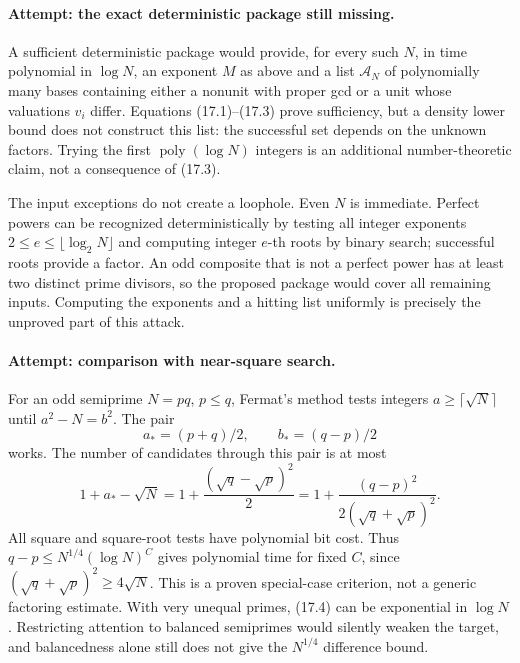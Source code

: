 \documentclass[11pt,a4paper]{article}
\begin{document}
\paragraph{Attempt: the exact deterministic package still missing.}
A sufficient deterministic package would provide, for every such $N$,
in time polynomial in $\log N$, an exponent $M$ as above and a list
$\mathcal A_N$ of polynomially many bases containing either a nonunit
with proper gcd or a unit whose valuations $v_i$ differ. Equations
(17.1)--(17.3) prove sufficiency, but a density lower bound does not
construct this list: the successful set depends on the unknown factors.
Trying the first $\operatorname{poly}(\log N)$ integers is an additional
number-theoretic claim, not a consequence of (17.3).

The input exceptions do not create a loophole. Even $N$ is immediate.
Perfect powers can be recognized deterministically by testing all integer
exponents $2\leq e\leq\lfloor\log_2N\rfloor$ and computing integer
$e$-th roots by binary search; successful roots provide a factor. An odd
composite that is not a perfect power has at least two distinct prime
divisors, so the proposed package would cover all remaining inputs.
Computing the exponents and a hitting list uniformly is precisely the
unproved part of this attack.

\paragraph{Attempt: comparison with near-square search.}
For an odd semiprime $N=pq$, $p\leq q$, Fermat's method tests integers
$a\geq\lceil\sqrt N\rceil$ until $a^2-N=b^2$. The pair
\[
 a_*=(p+q)/2,\qquad b_*=(q-p)/2
\]
works. The number of candidates through this pair is at most
\[
 1+a_*-\sqrt N
 =1+\frac{(\sqrt q-\sqrt p)^2}{2}
 =1+\frac{(q-p)^2}{2(\sqrt q+\sqrt p)^2}.
 \tag{17.4}
\]
All square and square-root tests have polynomial bit cost. Thus
$q-p\leq N^{1/4}(\log N)^C$ gives polynomial time for fixed $C$, since
$(\sqrt q+\sqrt p)^2\geq4\sqrt N$. This is a proven special-case
criterion, not a generic factoring estimate. With very unequal primes,
(17.4) can be exponential in $\log N$. Restricting attention to balanced
semiprimes would silently weaken the target, and balancedness alone
still does not give the $N^{1/4}$ difference bound.
\end{document}
